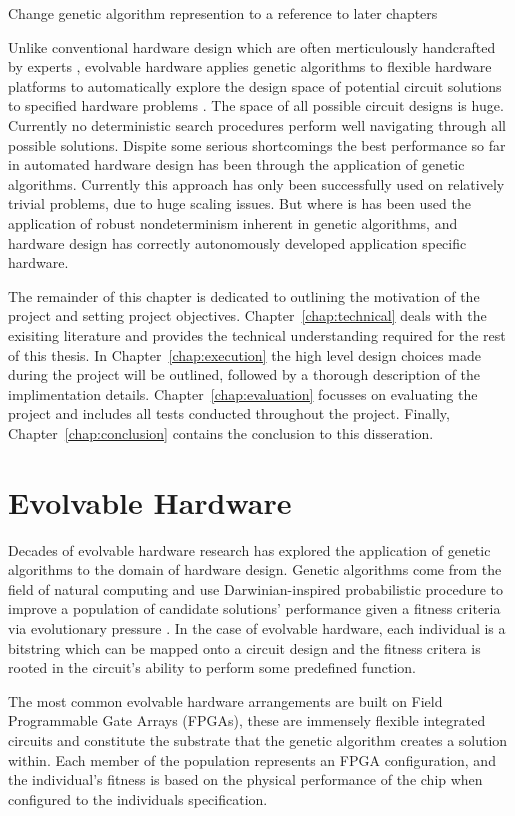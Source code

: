 \todo Change genetic algorithm represention to a reference to later chapters

Unlike conventional hardware design which are often merticulously handcrafted
by experts , evolvable hardware applies genetic algorithms to
flexible hardware platforms to automatically explore the design space of potential
circuit solutions to specified hardware problems \cite{541893}.
The space of all possible circuit designs is huge. Currently no deterministic
search procedures perform well navigating through all possible solutions.
Dispite some serious shortcomings the best performance so far in automated
hardware design has been through the application of genetic algorithms.
Currently this approach has only been successfully used on relatively
trivial problems, due to huge scaling issues. But where is has been used
the application of
robust nondeterminism inherent in genetic algorithms, and hardware design
has correctly autonomously developed application specific hardware.

The remainder of this chapter is dedicated to outlining the motivation of the
project and setting project objectives. Chapter~\ref{chap:technical} deals with
the exisiting literature and provides the technical understanding required for the
rest of this thesis. In Chapter~\ref{chap:execution} the high level design choices
made during the project will be outlined, followed by a thorough description of
the implimentation details. Chapter~\ref{chap:evaluation} focusses on evaluating
the project and includes all tests conducted throughout the project. Finally,
Chapter~\ref{chap:conclusion} contains the conclusion to this disseration.

\section{Evolvable Hardware \label{s:ehw}}
Decades of evolvable hardware research has explored the application of genetic algorithms to
the domain of hardware design. Genetic algorithms come from the field of natural
computing and use Darwinian-inspired probabilistic procedure to improve a population
of candidate solutions'
performance given a fitness criteria via evolutionary pressure \cite{Goldberg:1989:GAS:534133}.
In the case of evolvable hardware,
each individual is a bitstring which can be mapped onto a circuit design
and the fitness critera is rooted
in the circuit's ability to perform some predefined function.

The most common evolvable hardware arrangements
are built on Field Programmable Gate Arrays (FPGAs), these are immensely
flexible integrated circuits and constitute the substrate that the genetic
algorithm creates a solution within. Each member of the population
represents an FPGA configuration, and the individual's fitness is based on the
physical performance of the chip when configured to the individuals specification.

